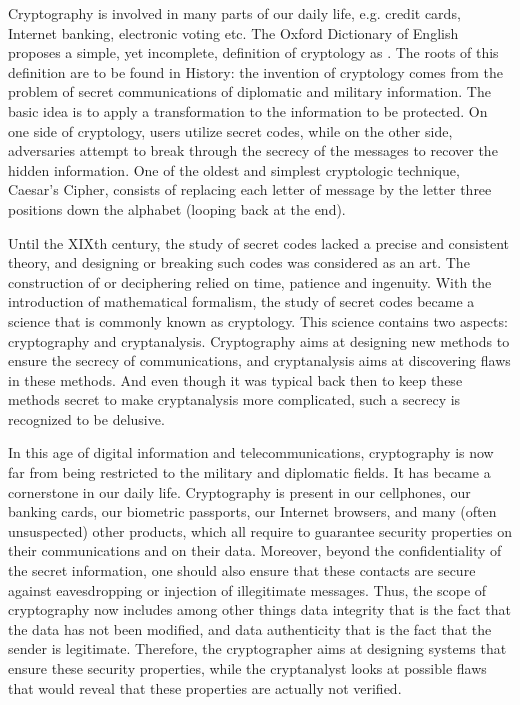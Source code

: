 Cryptography is involved in many parts of our daily life, e.g. credit cards, Internet banking, electronic voting etc. The Oxford Dictionary of English proposes a simple, yet incomplete, definition of cryptology as . The roots of this definition are to be found in History: the invention of cryptology comes from the problem of secret communications of diplomatic and military information. The basic idea is to apply a  transformation to the information to be protected. On one side of cryptology, users utilize secret codes, while on the other side, adversaries attempt to break through the secrecy of the messages to recover the hidden information. One of the oldest and simplest cryptologic technique, Caesar's Cipher, consists of replacing each letter of message by the letter three positions down the alphabet (looping back at the end).

Until the XIXth century, the study of secret codes lacked a precise and consistent theory, and designing or breaking such codes was considered as an art. The construction of  or deciphering relied on time, patience and ingenuity. With the introduction of mathematical formalism, the study of secret codes became a science that is commonly known as cryptology. This science contains two aspects: cryptography and cryptanalysis. Cryptography aims at designing new methods to ensure the secrecy of communications, and cryptanalysis aims at discovering flaws in these methods. And even though it was typical back then to keep these methods secret to make cryptanalysis more complicated, such a secrecy  is recognized to be delusive.


In this age of digital information and telecommunications, cryptography is now far from being restricted to the military and diplomatic fields. It has became a cornerstone in our daily life. Cryptography is present in our cellphones, our banking cards, our biometric passports, our Internet browsers, and many (often unsuspected) other products, which all require to guarantee security properties on their communications and on their data. Moreover, beyond the confidentiality of the secret information, one should also ensure that these contacts are secure against eavesdropping or injection of illegitimate messages. Thus, the scope of cryptography now includes among other things data integrity that is the fact that the data has not been modified, and data authenticity that is the fact that the sender is legitimate. Therefore, the cryptographer aims at designing systems that ensure these security properties, while the cryptanalyst looks at possible flaws that would reveal that these properties are actually not verified.


